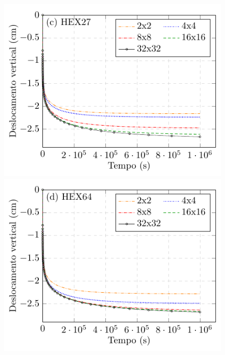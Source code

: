 \documentclass[Tese.tex]{subfiles}
\begin{document}
{\begin{figure}[!htb]
	\includegraphics[scale=1.0]{Figuras/PTFE-cylinder-mesh/VepCylinder-Creep-v-2.pdf}\;\;\includegraphics[scale=1.0]{Figuras/PTFE-cylinder-mesh/VepCylinder-Creep-v-3.pdf}		
\end{figure}

}
\end{document}
